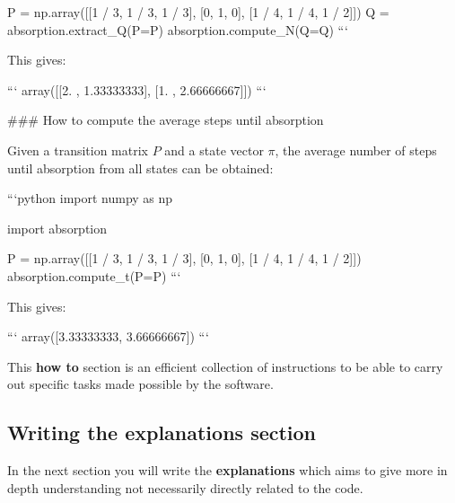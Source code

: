 \begin{md}
P = np.array([[1 / 3, 1 / 3, 1 / 3], [0, 1, 0], [1 / 4, 1 / 4, 1 / 2]])
Q = absorption.extract_Q(P=P)
absorption.compute_N(Q=Q)
```

This gives:

```
array([[2.        , 1.33333333],
       [1.        , 2.66666667]])
```

### How to compute the average steps until absorption

Given a transition matrix $P$ and a state vector $\pi$, the average number of
steps until absorption from all states can be obtained:

```python
import numpy as np

import absorption

P = np.array([[1 / 3, 1 / 3, 1 / 3], [0, 1, 0], [1 / 4, 1 / 4, 1 / 2]])
absorption.compute_t(P=P)
```

This gives:

```
array([3.33333333, 3.66666667])
```
\end{md}

This \textbf{how to} section is an efficient collection of instructions to be
able to carry out specific tasks made possible by the software.


\subsection{Writing the explanations section}
\label{\detokenize{building-tools/06-documentation/tutorial/main:writing-the-explanations-section}}

In the next section you will write the \textbf{explanations} which aims to give more
in depth understanding not necessarily directly related to the code.

